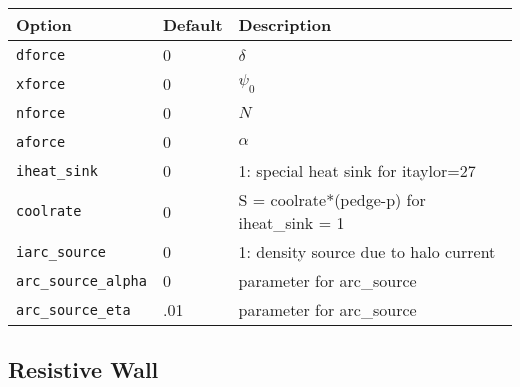 \begin{tabular}{llp{4.5in}}
  \textbf{Option}&\textbf{Default}&\textbf{Description}\\
  \hline
  \texttt{dforce}  & 0 &  $\delta$ \\
  \texttt{xforce}  & 0 &  $\psi_0$ \\
  \texttt{nforce}  & 0 &  $N$ \\
  \texttt{aforce}   & 0 &  $ \alpha $ \\
  \texttt{iheat\_sink}         & 0 & 1:  special heat sink for itaylor=27  \\
  \texttt{coolrate}            & 0 & S = coolrate*(pedge-p) for iheat\_sink = 1 \\
  \texttt{iarc\_source}        & 0 & 1: density source due to halo current \\
  \texttt{arc\_source\_alpha}  & 0 &   parameter for arc\_source \\
  \texttt{arc\_source\_eta}    & .01 & parameter for arc\_source

\end{tabular}
\subsection{Resistive Wall}

